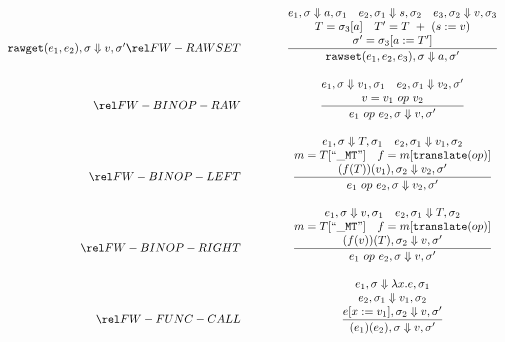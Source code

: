 \begin{figure}[P]
\[\begin{array}{r@{\qquad\qquad}c}
{}{
  \semanticFull {{\tt rawget}(e_1,e_2)} {\sigma}   {v} {\sigma'}
}
\ssrule{FW-RAWSET}{
  \semanticFull{e_1}{\sigma}{a}{\sigma_1} \quad
  \semanticFull{e_2}{\sigma_1}{s}{\sigma_2} \quad
  \semanticFull{e_3}{\sigma_2}{v}{\sigma_3} \\
  T = \sigma_3[a] \quad
  T' = T~+~(s := v) \\
  \sigma' = \sigma_3[a:=T']
}{
  \semanticFull{{\tt rawset}(e_1,e_2,e_3)}{\sigma}{a}{\sigma'}
}
\ssrule{FW-BINOP-RAW}{
  \semanticFull{e_1}{\sigma}{v_1}{\sigma_1} \quad
  \semanticFull{e_2}{\sigma_1}{v_2}{\sigma'} \\
  v = v_1 ~op~ v_2
}{
  \semanticFull{e_1 ~op~ e_2}{\sigma}{v}{\sigma'}
}
\ssrule{FW-BINOP-LEFT}{
  \semanticFull{e_1}{\sigma}{T}{\sigma_1} \quad
  \semanticFull{e_2}{\sigma_1}{v_1}{\sigma_2} \\
  m = T[{\tt ``{\_}MT"}]\quad
  f = m[{\tt translate}(op)]\\
   \semanticFull{(f(T))(v_1)}  {\sigma_2}    {v_2} {\sigma'} \\
}{
  \semanticFull{e_1 ~op~ e_2}{\sigma}{v_2}{\sigma'}
}
\ssrule{FW-BINOP-RIGHT}{
  \semanticFull{e_1}{\sigma}{v}{\sigma_1} \quad
  \semanticFull{e_2}{\sigma_1}{T}{\sigma_2} \\
  m = T[{\tt ``{\_}MT"}]\quad
  f = m[{\tt translate}(op)]\\
   \semanticFull{(f(v))(T)}  {\sigma_2}    {v} {\sigma'} \\
}{
  \semanticFull{e_1 ~op~ e_2}{\sigma}{v}{\sigma'}
}
\ssrule{FW-FUNC-CALL}{
  \semanticFull{e_1}{\sigma}{\aFunction{x}{e}}{\sigma_1} \\
  \semanticFull{e_2}{\sigma_1}{v_1}{\sigma_2} \\
  \semanticFull{e[x:=v_1]}{\sigma_2}{v}{\sigma'} 
}{
  \semanticFull{(e_1)(e_2)}{\sigma}{v}{\sigma'} 
}
\end{array}
\]
\end{figure}

